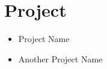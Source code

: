 
\section*{Project}
\begin{itemize}[leftmargin=*,label={},itemsep=-2pt]
  \item Project Name
  \item Another Project Name
\end{itemize}
